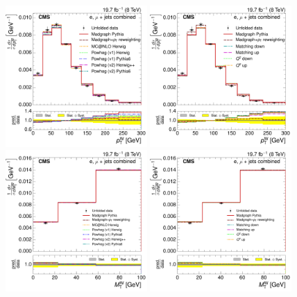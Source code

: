 \begin{figure}[hbtp]
    \centering
     \includegraphics[width=0.48\textwidth]{Chapters/07_08_09_Analysis/Images/results/fit/8TeV/WPT/central/normalised_xsection_combined_different_generators.pdf}\hfill
     \includegraphics[width=0.48\textwidth]{Chapters/07_08_09_Analysis/Images/results/fit/8TeV/WPT/central/normalised_xsection_combined_systematics_shifts.pdf}\\
     \includegraphics[width=0.48\textwidth]{Chapters/07_08_09_Analysis/Images/results/fit/8TeV/MT/central/normalised_xsection_combined_different_generators.pdf}\hfill
     \includegraphics[width=0.48\textwidth]{Chapters/07_08_09_Analysis/Images/results/fit/8TeV/MT/central/normalised_xsection_combined_systematics_shifts.pdf}\\

\end{figure}
